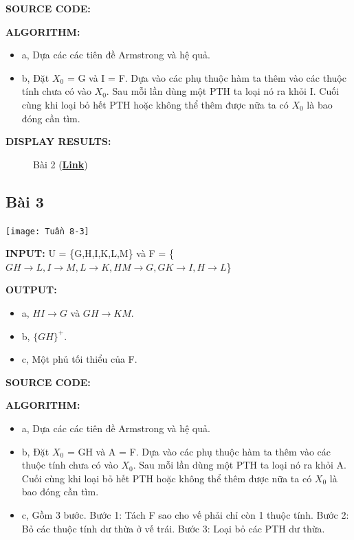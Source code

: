 \documentclass[12pt,a4paper]{report}
\begin{document}
	{\bf SOURCE CODE:}
	
	{\bf ALGORITHM:}
	\begin{itemize}
		\item a, Dựa các các tiên đề Armstrong và hệ quả.
		\item b, Đặt $X_0$ = G và I = F. Dựa vào các phụ thuộc hàm ta thêm vào các thuộc tính chưa có vào $X_0$. Sau mỗi lần dùng một PTH ta loại nó ra khỏi I. Cuối cùng khi loại bỏ hết PTH hoặc không thể thêm được nữa ta có $X_0$ là bao đóng cần tìm. 
	\end{itemize}

	{\bf DISPLAY RESULTS:}
		\begin{figure}[!h]
		\hfill
		\caption{Bài 2 (\href{https://drive.google.com/drive/folders/18bppOD8kB9FX16mTBPA5vzgMh5qRWkda}{\bf Link})}
		\end{figure}

\subsection{Bài 3}
	\begin{center}
		\texttt{[image: Tuần 8-3]}
	\end{center}

	{\bf INPUT:} U = \{G,H,I,K,L,M\} và F = \{$GH\rightarrow L,I\rightarrow M,L\rightarrow K,HM\rightarrow G,GK\rightarrow I,H\rightarrow L$\}
	
	{\bf OUTPUT:}
	\begin{itemize}
		\item a, $HI\rightarrow G$ và $GH\rightarrow KM$.
		\item b, $\{GH\}^+$.
		\item c, Một phủ tối thiểu của F.
	\end{itemize}
	
	{\bf SOURCE CODE:}
	
	{\bf ALGORITHM:}
	\begin{itemize}
		\item a, Dựa các các tiên đề Armstrong và hệ quả.
		\item b, Đặt $X_0$ = GH và A = F. Dựa vào các phụ thuộc hàm ta thêm vào các thuộc tính chưa có vào $X_0$. Sau mỗi lần dùng một PTH ta loại nó ra khỏi A. Cuối cùng khi loại bỏ hết PTH hoặc không thể thêm được nữa ta có $X_0$ là bao đóng cần tìm.
		\item c, Gồm 3 bước. Bước 1: Tách F sao cho vế phải chỉ còn 1 thuộc tính. Bước 2: Bỏ các thuộc tính dư thừa ở vế trái. Bước 3: Loại bỏ các PTH dư thừa. 
	\end{itemize}
\end{document}
